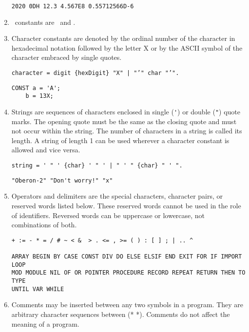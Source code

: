 \documentclass[12pt]{article}
\begin{document}
\begin{enumerate}
\begin{lstlisting}[style=example]
    2020 0DH 12.3 4.567E8 0.55712566D-6
\end{lstlisting} 

\item \BOOLEAN\ constants are \TRUE\ and \FALSE. \label{bool-consts}

\item Character constants are denoted by the ordinal number of the character in hexadecimal notation followed by the letter X or by the ASCII symbol of the character embraced by single quotes.

\begin{lstlisting}[style=ebnf]
character = digit {hexDigit} "X" | "’" char "’".
\end{lstlisting}

\begin{lstlisting}[style=example]
CONST a = 'A';
    b = 13X;
\end{lstlisting} 

\item Strings are sequences of characters enclosed in single (\lstinline!'!) or double (\lstinline!"!) quote marks. The opening quote must be the same as the closing quote and must not occur within the string. The number of characters in a string is called its length. A string of length 1 can be used wherever a character constant is allowed and vice versa.

\begin{lstlisting}[style=ebnf]
string = ' " ' {char} ' " ' | " ' " {char} " ' ".
\end{lstlisting}

\begin{lstlisting}[style=example]
"Oberon-2" "Don't worry!" "x"
\end{lstlisting} 

\item Operators and delimiters are the special characters, character pairs, or reserved words listed below. These reserved words  cannot be used in the role of identifiers. Reversed words can be uppercase or lowercase, not combinations of both. 

\begin{lstlisting}[style=example]
+ := - * = / # ~ < &  > . <= , >= ( ) : [ ] ; | .. ^
    
ARRAY BEGIN BY CASE CONST DIV DO ELSE ELSIF END EXIT FOR IF IMPORT LOOP
MOD MODULE NIL OF OR POINTER PROCEDURE RECORD REPEAT RETURN THEN TO TYPE
UNTIL VAR WHILE
\end{lstlisting}

\item Comments may be inserted between any two symbols in a program. They are arbitrary character sequences between (* *). 
Comments do not affect the meaning of a program.

\end{enumerate}
\end{document}
